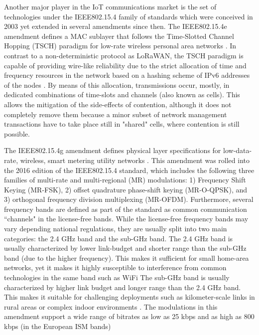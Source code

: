 \documentclass[journal]{IEEEtran}
\newcommand{\lorem}        {\textcolor{green}{Lorem ipsum dolor sit amet, consectetur adipiscing elit, sed do eiusmod tempor incididunt ut labore et dolore magna aliqua. Ut enim ad minim veniam, quis nostrud exercitation ullamco laboris nisi ut aliquip ex ea commodo consequat. Duis aute irure dolor in reprehenderit in voluptate velit esse cillum dolore eu fugiat nulla pariatur. Excepteur sint occaecat cupidatat non proident, sunt in culpa qui officia deserunt mollit anim id est laborum.}}
\begin{document}
Another major player in the IoT communications market is the set of technologies under the IEEE802.15.4 family of standards which were conceived in 2003 yet extended in several amendments since then. \cite{11ieee}
The  IEEE802.15.4e amendment defines a MAC sublayer that follows the Time-Slotted Channel Hopping (TSCH) paradigm for low-rate wireless personal area networks \cite{12ieeea}.
In contrast to a non-deterministic protocol as LoRaWAN, the TSCH paradigm is capable of providing wire-like reliability due to the strict allocation of time and frequency resources in the network based on a hashing scheme of IPv6 addresses of the nodes \cite{t.chang206tisch}.
By means of this allocation, transmissions occur, mostly, in dedicated combinations of time-slots and channels (also known as cells).
This allows the mitigation of the side-effects of contention, although it does not completely remove them because a minor subset of network management transactions have to take place still in "shared" cells, where contention is still possible.

The IEEE802.15.4g amendment defines physical layer specifications for low-data-rate, wireless, smart metering utility networks \cite{12ieee}.
This amendment was rolled into the 2016 edition of the IEEE802.15.4 standard, which includes the following three families of multi-rate and multi-regional (MR) modulations: 1) Frequency Shift Keying (MR-FSK), 2) offset quadrature phase-shift keying (MR-O-QPSK), and 3) orthogonal frequency division multiplexing (MR-OFDM).
Furthermore, several frequency bands are defined as part of the standard as common communication ``channels" in the license-free bands.
While the license-free frequency bands may vary depending national regulations, they are usually split into two main categories: the 2.4 GHz band and the sub-GHz band. 
The 2.4 GHz band is usually characterized by lower link-budget and shorter range than the sub-GHz band (due to the higher frequency). 
This makes it sufficient for small home-area networks, yet it makes it highly susceptible to interference from common technologies in the same band such as WiFi \cite{tuset-peiro19experimental}
The sub-GHz band is usually characterized by higher link budget and longer range than the 2.4 GHz band. 
This makes it suitable for challenging deployments such as kilometer-scale links in rural areas or complex indoor environments \cite{sotokmscale}.
The modulations in this amendment support a wide range of bitrates as low as 25 kbps and as high as 800 kbps (in the European ISM bands)
\end{document}
